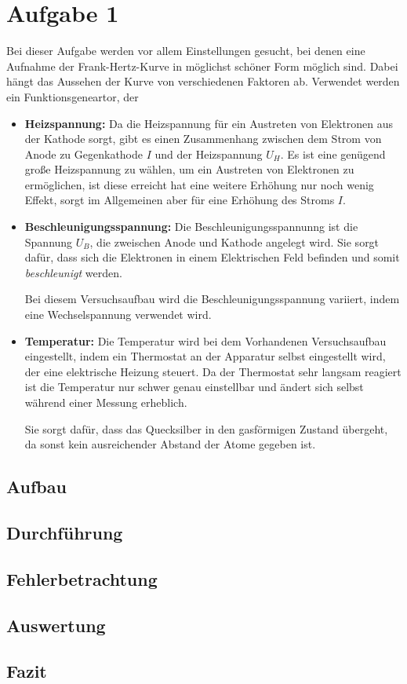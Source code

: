 \section{Aufgabe 1}
Bei dieser Aufgabe werden vor allem Einstellungen gesucht, bei denen eine Aufnahme der Frank-Hertz-Kurve in möglichst schöner Form möglich sind. Dabei hängt das Aussehen der Kurve von verschiedenen Faktoren ab. Verwendet werden ein Funktionsgeneartor, der 
\begin{itemize}
\item[] \textbf{Heizspannung:} Da die Heizspannung für ein Austreten von Elektronen aus der Kathode sorgt, gibt es einen Zusammenhang zwischen dem Strom von Anode zu Gegenkathode \(I\) und der Heizspannung \(U_H\). Es ist eine genügend große Heizspannung zu wählen, um ein Austreten von Elektronen zu ermöglichen, ist diese erreicht hat eine weitere Erhöhung nur noch wenig Effekt, sorgt im Allgemeinen aber für eine Erhöhung des Stroms \(I\).
\item[] \textbf{Beschleunigungsspannung:} Die Beschleunigungsspannunng ist die Spannung \(U_B\), die zweischen Anode und Kathode angelegt wird. Sie sorgt dafür, dass sich die Elektronen in einem Elektrischen Feld befinden und somit \textit{beschleunigt} werden.

Bei diesem Versuchsaufbau wird die Beschleunigungsspannung variiert, indem eine Wechselspannung verwendet wird.
\item[] \textbf{Temperatur:} Die Temperatur wird bei dem Vorhandenen Versuchsaufbau eingestellt, indem ein Thermostat an der Apparatur selbst eingestellt wird, der eine elektrische Heizung steuert. Da der Thermostat sehr langsam reagiert ist die Temperatur nur schwer genau einstellbar und ändert sich selbst während einer Messung erheblich.

Sie sorgt dafür, dass das Quecksilber in den gasförmigen Zustand übergeht, da sonst kein ausreichender Abstand der Atome gegeben ist.
\end{itemize}
\subsection{Aufbau}
\subsection{Durchführung}
\subsection{Fehlerbetrachtung}
\subsection{Auswertung}
\subsection{Fazit}